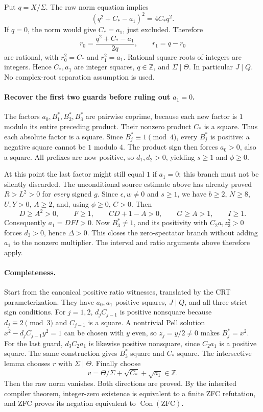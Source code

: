 Put $q=X/\Sigma$. The raw norm equation implies
\[
 (q^2+C_*-a_1)^2=4C_*q^2.
\]
If $q=0$, the norm would give $C_*=a_1$, just excluded. Therefore
\[
 r_0=\frac{q^2+C_*-a_1}{2q},\qquad r_1=q-r_0
\]
are rational, with $r_0^2=C_*$ and $r_1^2=a_1$. Rational square roots of
integers are integers. Hence $C_*,a_1$ are integer squares,
$q\in\mathbb Z$, and $\Sigma\mid\Theta$. In particular $J\mid Q$.
No complex-root separation assumption is used.

\paragraph{Recover the first two guards before ruling out $a_1=0$.}
The factors $a_0,B_1^*,B_2^*,B_3^*$ are pairwise coprime, because each
new factor is $1$ modulo its entire preceding product. Their nonzero product
$C_*$ is a square. Thus each absolute factor is a square. Since
$B_j^*\equiv1\pmod4$, every $B_j^*$ is positive: a negative square cannot
be $1$ modulo $4$. The product sign then forces $a_0>0$, also a square.
All prefixes are now positive, so $d_1,d_2>0$, yielding $s\ge1$ and
$\phi\ge0$.

At this point the last factor might still equal $1$ if $a_1=0$; this branch
must not be silently discarded. The unconditional source estimate above
has already proved $R>L^2>0$ for \emph{every} signed $g$. Since
$\epsilon,w\ne0$ and $s\ge1$, we have $b\ge2$, $N\ge8$, $U,Y>0$,
$A\ge2$, and, using $\phi\ge0$, $C>0$. Then
\[
 D\ge A^2>0,\qquad F\ge1,\qquad
 CD+1-A>0,\qquad G\ge A>1,\qquad I\ge1.
\]
Consequently $a_1=DFI>0$. Now $B_3^*\ne1$, and its positivity with
$C_2a_1z_3^2>0$ forces $d_3>0$, hence $\Delta>0$. This closes the
zero-spectator branch without adding $a_1$ to the nonzero multiplier.
The interval and ratio arguments above therefore apply.

\paragraph{Completeness.}
Start from the canonical positive ratio witnesses, translated by the CRT
parameterization. They have $a_0,a_1$ positive squares, $J\mid Q$, and all
three strict sign conditions. For $j=1,2$, $d_jC_{j-1}$ is positive
nonsquare because $d_j\equiv2\pmod3$ and $C_{j-1}$ is a square.
A nontrivial Pell solution $x^2-d_jC_{j-1}y^2=1$ can be chosen with $y$
even, so $z_j=y/2\ne0$ makes $B_j^*=x^2$. For the last guard,
$d_3C_2a_1$ is likewise positive nonsquare, since $C_2a_1$ is a positive
square. The same construction gives $B_3^*$ square and $C_*$ square.
The intersective lemma chooses $r$ with $\Sigma\mid\Theta$. Finally choose
\[
 v=\Theta/\Sigma+\sqrt{C_*}+\sqrt{a_1}\in\mathbb Z.
\]
Then the raw norm vanishes. Both directions are proved. By the inherited
compiler theorem, integer-zero existence is equivalent to a finite ZFC
refutation, and ZFC proves its negation equivalent to
$\operatorname{Con}(\mathrm{ZFC})$.

